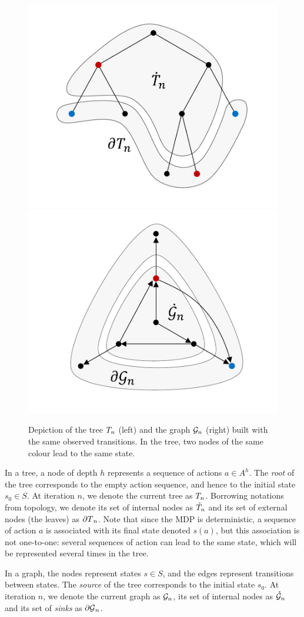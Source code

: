 \documentclass[runningheads]{llncs}
\begin{document}
\begin{figure}[tp]
	\centering
	\includegraphics[trim={1.8cm 1.2cm 1.9cm 1.2cm}, clip,width=0.44\linewidth]{img/tree_1}
	\hfill
	\includegraphics[trim={1.8cm 1.2cm 1.9cm 0.9cm}, clip,width=0.44\linewidth]{img/graph_1}
	\caption{Depiction of the tree $T_n$ (left) and the graph $\mathcal{G}_n$ (right) built with the same observed transitions. In the tree, two nodes of the same colour lead to the same state.}
	\label{fig:structures}
\end{figure}

In a tree, a node of depth $h$ represents a sequence of actions $a\in A^h$. The \textit{root} of the tree corresponds to the empty action sequence, and hence to the initial state $s_0\in S$. At iteration $n$, we denote the current tree as $T_n$. Borrowing notations from topology, we denote its set of internal nodes as $\mathring{T}_n$ and its set of external nodes (the leaves) as ${\partial T}_n$. Note that since the MDP is deterministic, a sequence of action $a$ is associated with its final state denoted $s(a)$, but this association is not one-to-one: several sequences of action can lead to the same state, which will be represented several times in the tree.

In a graph, the nodes represent states $s\in S$, and the edges represent transitions between states. The \textit{source} of the tree corresponds to the initial state $s_0$. At iteration $n$, we denote the current graph as $\mathcal{G}_n$, its set of internal nodes as $\mathring{\mathcal{G}}_n$ and its set of \textit{sinks} as ${\partial \mathcal{G}}_n$.
\end{document}
